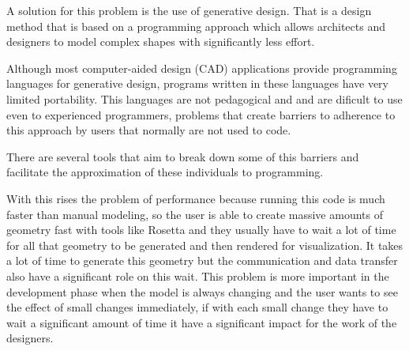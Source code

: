 A solution for this problem is the use of generative design. That is a design method that is based on a programming approach which allows architects and designers to model complex shapes with significantly less effort. 

Although most computer-aided design (CAD) applications provide programming languages for generative design, programs written in these languages have very limited portability. This languages are not pedagogical and and are dificult to use even to experienced programmers, problems that create barriers to adherence to this approach by users that normally are not used to code.\cite{ramos_et_al:OASIcs:2014:4565}

There are several tools that aim to break down some of this barriers and facilitate the approximation of these individuals to programming. 


With this rises the problem of performance because running this code is much faster than manual modeling, so the user is able to create massive amounts of geometry fast with tools like Rosetta and they usually have to wait a lot of time for all that geometry to be generated and then rendered for visualization. It takes a lot of time to generate this geometry but the communication and data transfer also have a significant role on this wait. This problem is more important in the development phase when the model is always changing and the user wants to see the effect of small changes immediately, if with each small change they have to wait a significant amount of time it have a significant impact for the work of the designers.


